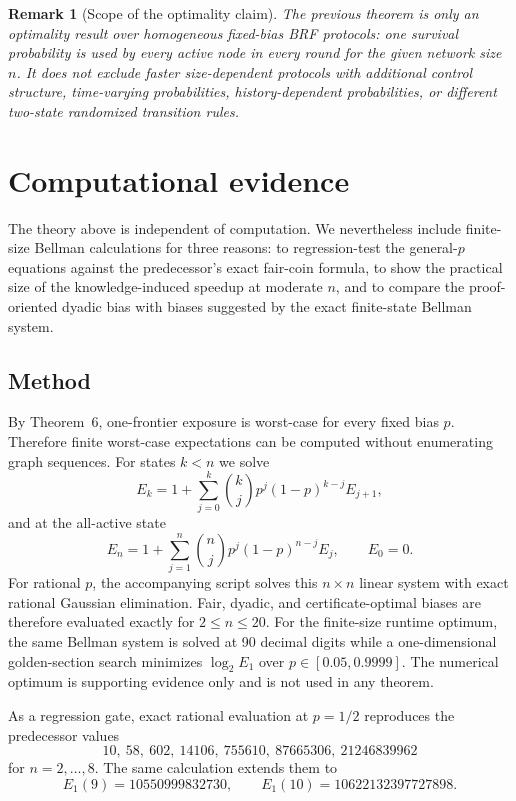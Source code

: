 \documentclass[11pt]{article}
\newtheorem{remark}[theorem]{Remark}
\begin{document}
\begin{remark}[Scope of the optimality claim]
The previous theorem is only an optimality result over homogeneous fixed-bias
BRF protocols: one survival probability is used by every active node in every
round for the given network size $n$.  It does not exclude faster
size-dependent protocols with additional control structure, time-varying
probabilities, history-dependent probabilities, or different two-state
randomized transition rules.
\end{remark}


\section{Computational evidence}\label{sec:experiments}
The theory above is independent of computation.  We nevertheless include finite-size Bellman calculations for three reasons: to regression-test the general-$p$ equations against the predecessor's exact fair-coin formula, to show the practical size of the knowledge-induced speedup at moderate $n$, and to compare the proof-oriented dyadic bias with biases suggested by the exact finite-state Bellman system.

\subsection{Method}
By Theorem~6, one-frontier exposure is worst-case for every fixed bias $p$.  Therefore finite worst-case expectations can be computed without enumerating graph sequences.  For states $k<n$ we solve
\[
  E_k
  =
  1+\sum_{j=0}^{k}\binom{k}{j}p^j{(1-p)}^{k-j}E_{j+1},
\]
and at the all-active state
\[
  E_n
  =
  1+\sum_{j=1}^{n}\binom{n}{j}p^j{(1-p)}^{n-j}E_j,
  \qquad E_0=0.
\]
For rational $p$, the accompanying script solves this $n\times n$ linear system with exact rational Gaussian elimination.  Fair, dyadic, and certificate-optimal biases are therefore evaluated exactly for $2\le n\le20$.  For the finite-size runtime optimum, the same Bellman system is solved at 90 decimal digits while a one-dimensional golden-section search minimizes $\log_2 E_1$ over $p\in[0.05,0.9999]$.  The numerical optimum is supporting evidence only and is not used in any theorem.

As a regression gate, exact rational evaluation at $p=1/2$ reproduces the predecessor values
\[
10,\ 58,\ 602,\ 14106,\ 755610,\ 87665306,\ 21246839962
\]
for $n=2,\ldots,8$.  The same calculation extends them to
\[
E_1(9)=10550999832730,
\qquad
E_1(10)=10622132397727898.
\]
\end{document}
